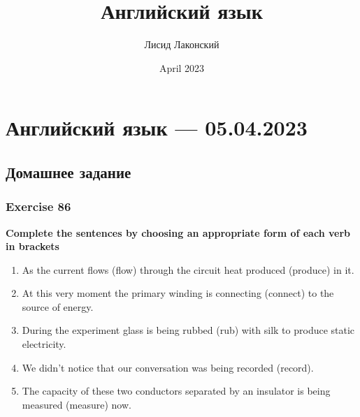 \documentclass{article}
\title{Английский язык}
\author{Лисид Лаконский}
\date{April 2023}
\begin{document}
\raggedright

\maketitle
\tableofcontents
\pagebreak

\section{Английский язык — 05.04.2023}

\subsection{Домашнее задание}

\subsubsection{Exercise 86}

\textbf{Complete the sentences by choosing an appropriate form of each verb in brackets}

\begin{enumerate}
	\item As the current flows (flow) through the circuit heat produced (produce) in it.
	\item At this very moment the primary winding is connecting (connect) to the source of energy.
	\item During the experiment glass is being rubbed (rub) with silk to produce static electricity.
	\item We didn't notice that our conversation was being recorded (record).
	\item The capacity of these two conductors separated by an insulator is being measured (measure) now.
\end{enumerate}
\end{document}
